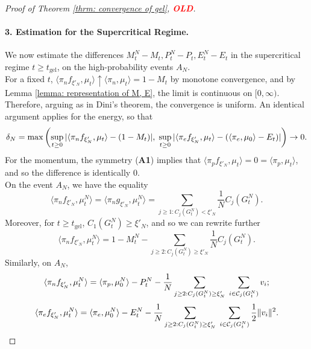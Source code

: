 \begin{proof}[Proof of Theorem \ref{thrm: convergence of gel}, \textcolor{red}{\textbf{OLD}}]
\begin{equation}
   \end{equation} \paragraph{3. Estimation for the Supercritical Regime.} We now estimate the differences $M^N_t-M_t, P^N_t-P_t, E^N_t-E_t$ in the supercritical regime $t\geq t_\text{gel}$, on the high-probability events $A_N.$ \medskip \\ For a fixed $t$, $\langle \pi_nf_{\xi'_N},\mu_t\rangle \uparrow \langle \pi_n, \mu_t\rangle=1-M_t$ by monotone convergence, and by Lemma \ref{lemma: representation of M, E}, the limit is continuous on $[0, \infty)$. Therefore, arguing as in Dini's theorem, the convergence is uniform. An identical argument applies for the energy, so that   \begin{equation}\label{eq: definition of deltaN} \delta_N=\max\left(\sup_{t\geq 0}|\langle \pi_n f_{\xi'_N}, \mu_t\rangle - (1-M_t)|,\hspace{0.1cm}  \sup_{t\geq 0}|\langle \pi_e f_{\xi'_N}, \mu_t\rangle - (\langle \pi_e, \mu_0\rangle -E_t)|\right) \rightarrow 0. \end{equation} For the momentum, the symmetry (\textbf{A1}) implies that $\langle \pi_p f_{\xi'_N}, \mu_t\rangle =0=\langle \pi_p, \mu_t\rangle$, and so the difference is identically 0. \medskip \\ On the event $A_N$, we have the equality \begin{equation} 
       \langle \pi_n f_{\xi'_N}, \mu^N_t\rangle =\langle \pi_n g_{\xi'_N}, \mu^N_t\rangle =\sum_{j\geq 1: C_j(G^N_t)< \xi'_N} \frac{1}{N}C_j(G^N_t).
   \end{equation} Moreover, for $t\geq t_\text{gel}$, $C_1(G^N_t)\geq \xi'_N$, and so we can rewrite further  \begin{equation} \label{eq: extracting MNT on AN}
       \langle \pi_n f_{\xi'_N}, \mu^N_t\rangle  =1-M^N_t-\sum_{j\geq 2: C_j(G^N_t)\geq \xi'_N} \frac{1}{N}C_j(G^N_t).
   \end{equation} Similarly, on $A_N$, \begin{equation} 
       \langle \pi_n f_{\xi'_N}, \mu^N_t\rangle  =\langle \pi_p, \mu^N_0\rangle-P^N_t-\frac{1}{N} \sum_{j\geq 2: C_j(G^N_t)\geq \xi'_N} \hspace{0.1cm}\sum_{i \in \mathcal{C}_j(G^N_t)} v_i;
   \end{equation} \begin{equation} 
       \langle \pi_e f_{\xi'_N}, \mu^N_t\rangle  =\langle \pi_e, \mu^N_0\rangle-E^N_t-\frac{1}{N} \sum_{j\geq 2: C_j(G^N_t)\geq \xi'_N} \hspace{0.1cm}\sum_{i \in \mathcal{C}_j(G^N_t)} \frac{1}{2}\|v_i\|^2.

\end{equation}
\end{proof}
